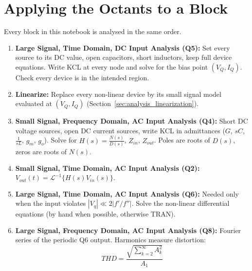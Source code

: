 \section{Applying the Octants to a Block}\label{sec:analysis_workflow}
Every block in this notebook is analysed in the same order.
\begin{enumerate}
  \item \textbf{Large Signal, Time Domain, DC Input Analysis (Q5):} Set every source to its DC
    value, open capacitors, short inductors, keep full device equations.
    Write KCL at every node and solve for the bias point \((V_Q, I_Q)\).
    Check every device is in the intended region.
  \item \textbf{Linearize:} Replace every non-linear device by its small
    signal model evaluated at \((V_Q, I_Q)\)
    (Section~\ref{sec:analysis_linearization}).
  \item \textbf{Small Signal, Frequency Domain, AC Input Analysis (Q4):} Short DC voltage
    sources, open DC current sources, write KCL in admittances
    (\(G\), \(sC\), \(\frac{1}{sL}\), \(g_m\), \(g_o\)). Solve for
    \(H(s) = \frac{N(s)}{D(s)}\), \(Z_{in}\), \(Z_{out}\). Poles are roots
    of \(D(s)\), zeros are roots of \(N(s)\).
  \item \textbf{Small Signal, Time Domain, AC Input Analysis (Q2):} \(V_{out}(t) =
    \mathcal{L}^{-1}\{H(s) V_{in}(s)\}\).
  \item \textbf{Large Signal, Time Domain, AC Input Analysis (Q6):} Needed only when the input
    violates \(|V_q| \ll 2|f'/f''|\). Solve the non-linear differential
    equations (by hand when possible, otherwise TRAN).
  \item \textbf{Large Signal, Frequency Domain, AC Input Analysis (Q8):} Fourier series of the
    periodic Q6 output. Harmonics measure distortion:
    \[
      THD = \frac{\sqrt{\sum_{k=2}^{\infty} A_k^2}}{A_1}
    \]
\end{enumerate}

